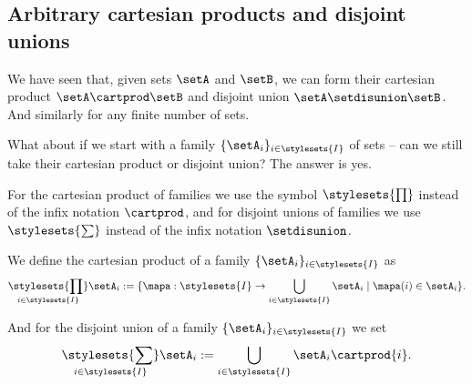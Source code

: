 \subsection{Arbitrary cartesian products and disjoint unions}

We have seen that, given sets $\setA$ and $\setB$, we can form their cartesian product $\setA \cartprod \setB$ and disjoint union $\setA \setdisunion \setB$. And similarly for any finite number of sets. 

What about if we start with a family $\{ \setA_i \}_{i \in \stylesets{I}}$ of sets -- can we still take their cartesian product or disjoint union? 
The answer is yes. 

For the cartesian product of families we use the symbol $\stylesets{\prod}$ instead of the infix notation $\cartprod$, and for disjoint unions of families we use $\stylesets{\sum}$ instead of the infix notation $\setdisunion$. 

We define the cartesian product of a family $\{ \setA_i \}_{i \in \stylesets{I}}$ as
\begin{equation}
\underset{i \in \stylesets{I}}{\stylesets{\prod}}  \setA_i  := \{ \mapa : \stylesets{I} \to \bigcup_{i \in \stylesets{I} } \setA_i \mid \mapa(i) \in \setA_i \}.
\end{equation}


And for the disjoint union of a family $\{ \setA_i \}_{i \in \stylesets{I}}$ we set 
\begin{equation}
\underset{i \in \stylesets{I}}{\stylesets{\sum}} \setA_i := \bigcup_{i \in \stylesets{I}} \setA_i \cartprod \{ i \}.
\end{equation}







